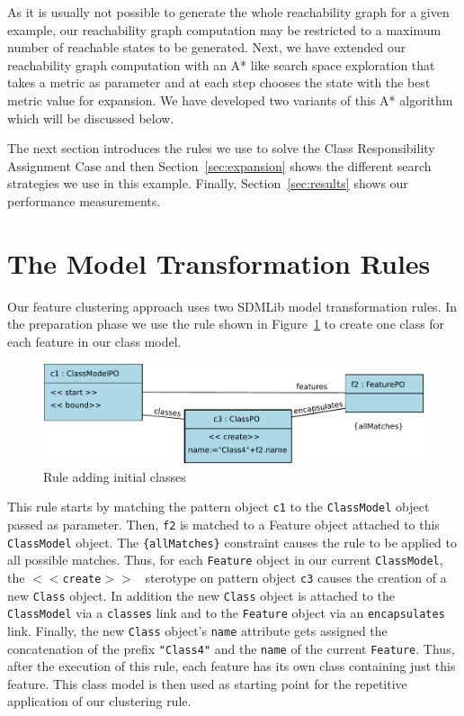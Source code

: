 \documentclass[a4paper]{article}
\begin{document}
As it is usually not possible to generate the whole reachability graph for a given example, 
our reachability graph computation may be restricted to a maximum number of reachable 
states to be generated. Next, we have extended our reachability graph computation with an A* 
like search space exploration that takes a metric as parameter and at each step chooses the 
state with the best metric value for expansion. We have developed two variants of this A* 
algorithm which will be discussed below. 

The next section introduces the rules we use to solve the Class Responsibility Assignment Case
and then Section~\ref{sec:expansion} shows the different search strategies we use in this 
example. Finally, Section~\ref{sec:results} shows our performance measurements. 
 

\section{The Model Transformation Rules}
\label{sec:rules}

Our feature clustering approach uses two SDMLib model transformation rules. In the 
preparation phase we use the rule shown in Figure~\ref{fig:RuleInitialClasses} to create 
one class for each feature in our class model. 

\begin{figure}[ht] \centering
	\includegraphics[width=\linewidth]{images/RuleAddInitialClasses.pdf}
 \caption{Rule adding initial classes}
 \label{fig:RuleInitialClasses}
\end{figure}

This rule starts by matching the pattern object \texttt{c1} to the 
\texttt{ClassModel} object passed as parameter. Then, \texttt{f2} is matched to a 
Feature object attached to this \texttt{ClassModel} object. The 
\texttt{\{allMatches\}} constraint causes the rule to be applied to all possible 
matches. Thus, for each \texttt{Feature} object in our current 
\texttt{ClassModel}, the \texttt {$<<$create$>>$ } sterotype on pattern object 
\texttt{c3} causes the creation of a new \texttt{Class} object. In addition 
the new \texttt{Class} object is attached to the \texttt{ClassModel} via a 
\texttt{classes} link and to the \texttt{Feature} object via an 
\texttt{encapsulates} link. Finally, the new \texttt{Class} object's \texttt{name} 
attribute gets assigned the concatenation of the prefix \texttt{"Class4"} 
and the \texttt{name} of the current \texttt{Feature}. Thus, after the 
execution of this rule, each feature has its own class containing just this 
feature. This class model is then used as starting point for the repetitive 
application of our clustering rule. 
\end{document}
